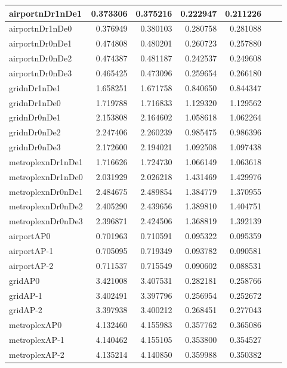 \begin{longtable}{|l|r|r|r|r|r|r|}
\endlastfoot
airportnDr1nDe1 & 0.373306 & 0.375216 & 0.222947 & 0.211226 \\ \hline
airportnDr1nDe0 & 0.376949 & 0.380103 & 0.280758 & 0.281088 \\ \hline
airportnDr0nDe1 & 0.474808 & 0.480201 & 0.260723 & 0.257880 \\ \hline
airportnDr0nDe2 & 0.474387 & 0.481187 & 0.242537 & 0.249608 \\ \hline
airportnDr0nDe3 & 0.465425 & 0.473096 & 0.259654 & 0.266180 \\ \hline
gridnDr1nDe1 & 1.658251 & 1.671758 & 0.840650 & 0.844347 \\ \hline
gridnDr1nDe0 & 1.719788 & 1.716833 & 1.129320 & 1.129562 \\ \hline
gridnDr0nDe1 & 2.153808 & 2.164602 & 1.058618 & 1.062264 \\ \hline
gridnDr0nDe2 & 2.247406 & 2.260239 & 0.985475 & 0.986396 \\ \hline
gridnDr0nDe3 & 2.172600 & 2.194021 & 1.092508 & 1.097438 \\ \hline
metroplexnDr1nDe1 & 1.716626 & 1.724730 & 1.066149 & 1.063618 \\ \hline
metroplexnDr1nDe0 & 2.031929 & 2.026218 & 1.431469 & 1.429976 \\ \hline
metroplexnDr0nDe1 & 2.484675 & 2.489854 & 1.384779 & 1.370955 \\ \hline
metroplexnDr0nDe2 & 2.405290 & 2.439656 & 1.389810 & 1.404751 \\ \hline
metroplexnDr0nDe3 & 2.396871 & 2.424506 & 1.368819 & 1.392139 \\ \hline
airportAP0 & 0.701963 & 0.710591 & 0.095322 & 0.095359 \\ \hline
airportAP-1 & 0.705095 & 0.719349 & 0.093782 & 0.090581 \\ \hline
airportAP-2 & 0.711537 & 0.715549 & 0.090602 & 0.088531 \\ \hline
gridAP0 & 3.421008 & 3.407531 & 0.282181 & 0.258766 \\ \hline
gridAP-1 & 3.402491 & 3.397796 & 0.256954 & 0.252672 \\ \hline
gridAP-2 & 3.397938 & 3.400212 & 0.268451 & 0.277043 \\ \hline
metroplexAP0 & 4.132460 & 4.155983 & 0.357762 & 0.365086 \\ \hline
metroplexAP-1 & 4.140462 & 4.155105 & 0.353800 & 0.354527 \\ \hline
metroplexAP-2 & 4.135214 & 4.140850 & 0.359988 & 0.350382 \\ \hline

\end{longtable}
